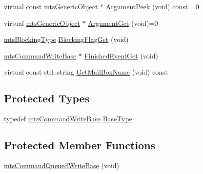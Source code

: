 \begin{DoxyCompactItemize}
virtual const \hyperlink{classmts_generic_object}{mts\+Generic\+Object} $\ast$ \hyperlink{classmts_command_queued_write_base_a40aee70e67c7415127e72be05eb6a3a4}{Argument\+Peek} (void) const =0
\item 
virtual \hyperlink{classmts_generic_object}{mts\+Generic\+Object} $\ast$ \hyperlink{classmts_command_queued_write_base_aa13d3a24097258f9975595930d582540}{Argument\+Get} (void)=0
\item 
\hyperlink{mts_forward_declarations_8h_ad7426ccb6c883bc780d0ee197dddcbe7}{mts\+Blocking\+Type} \hyperlink{classmts_command_queued_write_base_aa138c8036f3181703af3395845c92bd0}{Blocking\+Flag\+Get} (void)
\item 
\hyperlink{classmts_command_write_base}{mts\+Command\+Write\+Base} $\ast$ \hyperlink{classmts_command_queued_write_base_a2b0fa088500491f1a6af2d2f01d35733}{Finished\+Event\+Get} (void)
\item 
virtual const std\+::string \hyperlink{classmts_command_queued_write_base_afe6398dca9145cde8de0ba0d8de993df}{Get\+Mail\+Box\+Name} (void) const 
\end{DoxyCompactItemize}
\subsection*{Protected Types}
\begin{DoxyCompactItemize}
\item 
typedef \hyperlink{classmts_command_write_base}{mts\+Command\+Write\+Base} \hyperlink{classmts_command_queued_write_base_aff4a3cf3c103da033abb3cbee439d1ce}{Base\+Type}
\end{DoxyCompactItemize}
\subsection*{Protected Member Functions}
\begin{DoxyCompactItemize}
\item 
\hyperlink{classmts_command_queued_write_base_a37c683e821be080652509253afdf26f4}{mts\+Command\+Queued\+Write\+Base} (void)
\end{DoxyCompactItemize}

